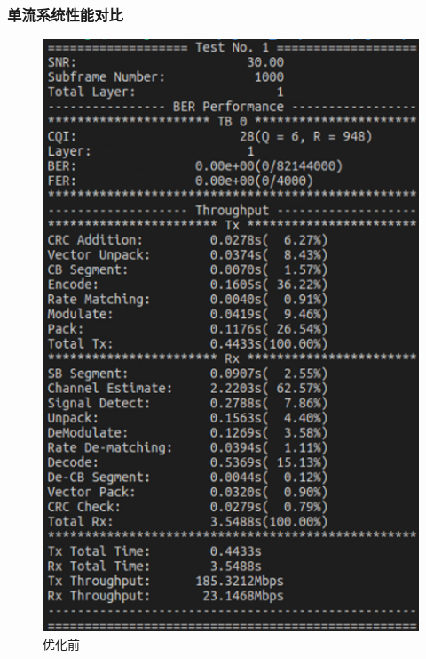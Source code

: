 \documentclass{article}
\begin{document}
\subsubsection{单流系统性能对比}
\begin{figure}[H]
	\centering
	\begin{minipage}[t]{0.48\textwidth}
		\centering
		\includegraphics[width = \textwidth]{comp1.png}
		\caption{优化前}
	\end{minipage}
	\begin{minipage}[t]{0.48\textwidth}
		\centering

\end{minipage}
\end{figure}
\end{document}
